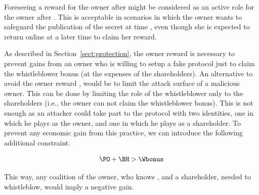Foreseeing a reward \RO for the owner after \td might be considered as an active role for the owner after \td. This is acceptable in scenarios in which the owner wants to safeguard the publication of the secret \secret at time \td, even though she is expected to return online at a later time to claim her reward.

As described in Section~\ref{sect:protection}, the owner reward \RO is necessary to prevent gains from an owner who is willing to setup a fake protocol just to claim the whistleblower bonus \Wbonus (at the expenses of the shareholders). 
An alternative to avoid the owner reward \RO, would be to limit the attack surface of a malicious owner. This can be done by limiting the role of the whistleblower only to the shareholders \shareholder (i.e., the owner can not claim the whistleblower bonus). This is not enough as an attacker could take part to the \shortname protocol with two identities, one in which he plays as the owner, and one in which he plays as a shareholder. To prevent any economic gain from this practice, we can introduce the following additional constraint.

\begin{equation}\label{noro}
\PO + \BH > \Wbonus
\end{equation}

This way, any coalition of the owner, who knows \secret, and a shareholder, needed to whistleblow, would imply a negative gain.

